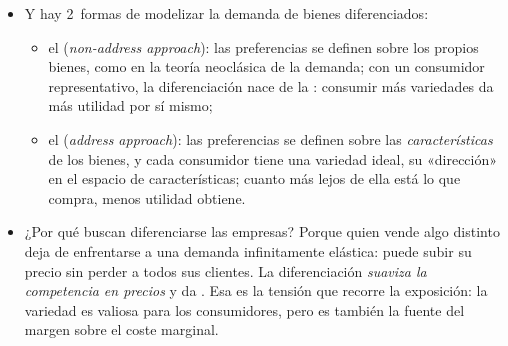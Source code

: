 \documentclass[11pt]{article}
\begin{document}
\begin{itemize}
\begin{itemize}
{\begin{itemize}
\item el de \emph{oferta}, que agrupa las empresas que usan tecnologías parecidas o producen el mismo bien (es el de la Clasificación Nacional de Actividades Económicas, hoy la CNAE-2025\nocite{BOE2025CNAE});
\item el de \emph{demanda}, que agrupa las empresas cuyos productos los consumidores consideran razonablemente sustitutivos.
\end{itemize}
Los problemas de definir el mercado de un bien diferenciado están en el anexo~\ref{anexo:mercado-relevante} .} La literatura distingue 2~tipos\nocite{Tirole1988Theory}:
    \begin{itemize}
    \item {}: los consumidores no se ponen de acuerdo en qué variedad es mejor; a igualdad de precio, cada uno elige una distinta (el sabor de un refresco, el color de un jersey, la ubicación de una tienda);
    \item {}: todos coinciden en qué variedad es mejor, la de más calidad, y solo difieren en cuánto están dispuestos a pagar por ella (un televisor con mejor imagen).\footnote{En la práctica conviven: quien compra un coche elige primero el segmento de precio, un problema de diferenciación vertical, y después, dentro de él, el modelo que más le gusta, un problema de diferenciación horizontal.}
    \end{itemize}
  \item Y hay 2~formas de modelizar la demanda de bienes diferenciados\nocite{EatonLipsey1989Product}:
    \begin{itemize}
    \item el  (\emph{non-address approach}): las preferencias se definen sobre los propios bienes, como en la teoría neoclásica de la demanda; con un consumidor representativo, la diferenciación nace de la : consumir más variedades da más utilidad por sí mismo;
    \item el  (\emph{address approach}): las preferencias se definen sobre las \emph{características} de los bienes, y cada consumidor tiene una variedad ideal, su «dirección» en el espacio de características; cuanto más lejos de ella está lo que compra, menos utilidad obtiene.
    \end{itemize}
  \item ¿Por qué buscan diferenciarse las empresas? Porque quien vende algo distinto deja de enfrentarse a una demanda infinitamente elástica: puede subir su precio sin perder a todos sus clientes. La diferenciación \emph{suaviza la competencia en precios} y da . Esa es la tensión que recorre la exposición: la variedad es valiosa para los consumidores, pero es también la fuente del margen sobre el coste marginal.
  \end{itemize}


\end{itemize}
\end{document}
